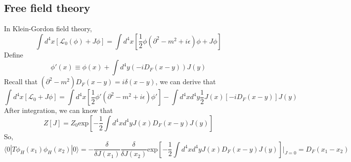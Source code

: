\subsection{Free field theory}
\noindent
In Klein-Gordon field theory,
\[\int d^4x [\mathcal{L}_0(\phi)+J\phi] = \int d^4x [\frac{1}{2}\phi (\partial^2 -m^2+i\epsilon)\phi + J\phi]\]
Define
\[\phi'(x) \equiv \phi(x) + \int d^4y (-iD_F(x-y)) J(y) \]
Recall that $(\partial^2-m^2)D_F(x-y) = i\delta(x-y)$, we can derive that
\[\int d^4x [\mathcal{L}_0+J\phi] = \int d^4x [\frac{1}{2}\phi' (\partial^2 -m^2+i\epsilon)\phi'] - \int d^4x d^4y \frac{1}{2} J(x)[-iD_F(x-y)]J(y)\]
After integration, we can know that
\[Z[J] = Z_0 \mathrm{exp} [-\frac{1}{2} \int d^4x d^4y J(x)D_F(x-y)J(y)]\]
So,
\[\langle 0 | T \phi_H(x_1) \phi_H(x_2) | 0 \rangle =  - \frac{\delta}{\delta J(x_1)} \frac{\delta}{\delta J(x_2)} \mathrm{exp} [-\frac{1}{2} \int d^4x d^4y J(x)D_F(x-y)J(y)]|_{J=0} = D_F(x_1-x_2)\]

